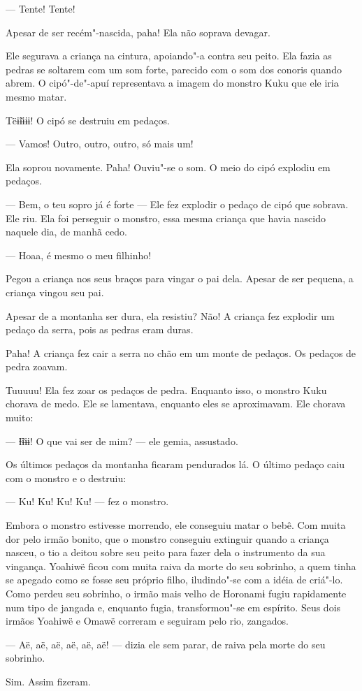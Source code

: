 --- Tente! Tente! 

Apesar de ser recém"-nascida, paha! Ela não soprava devagar. 
   
Ele segurava a criança na cintura, apoiando"-a contra seu peito. Ela fazia as pedras se soltarem com um som forte, parecido com o som dos
conoris quando abrem. O cipó"-de"-apuí representava a imagem do monstro
Kuku que ele iria mesmo matar. 

Tëɨ̃ɨɨɨɨ! O cipó se destruiu em pedaços. 

--- Vamos! Outro, outro, outro, só mais um!

Ela soprou novamente. Paha! Ouviu"-se o som. O meio do cipó explodiu em pedaços. 

--- Bem, o teu sopro já é forte --- Ele fez explodir o pedaço de cipó
que sobrava. Ele riu. Ela foi perseguir o monstro, essa mesma criança
que havia nascido naquele dia, de manhã cedo. 

--- Hoaa, é mesmo o meu filhinho! 

Pegou a criança nos seus braços para vingar o pai dela. Apesar de ser
pequena, a criança vingou seu pai. 

Apesar de a montanha ser dura, ela resistiu? Não! A criança fez explodir um
pedaço da serra, pois as pedras eram duras. 

Paha! A criança fez cair a serra no chão em um monte de pedaços. Os
pedaços de pedra zoavam.

Tuuuuu! Ela fez zoar os pedaços de pedra. Enquanto isso, o monstro Kuku
chorava de medo. Ele se lamentava, enquanto eles se aproximavam. Ele
chorava muito:

--- Ɨ̃ɨɨɨ! O que vai ser de mim? --- ele gemia, assustado. 

Os últimos pedaços da montanha ficaram pendurados lá. O último pedaço
caiu com o monstro e o destruiu: 

--- Ku! Ku! Ku! Ku! --- fez o monstro. 

Embora o monstro estivesse morrendo, ele conseguiu matar o bebê. Com
muita dor pelo irmão bonito, que o monstro conseguiu extinguir quando a
criança nasceu, o tio a deitou sobre seu peito para fazer dela o
instrumento da sua vingança. Yoahiwë ficou com muita raiva da morte do
seu sobrinho, a quem tinha se apegado como se fosse seu próprio filho,
iludindo"-se com a idéia de criá"-lo. Como perdeu seu sobrinho, o irmão
mais velho de Horonamɨ fugiu rapidamente num tipo de jangada e, enquanto
fugia, transformou"-se em espírito. Seus dois irmãos Yoahiwë e Omawë correram e seguiram pelo rio, zangados. 

--- Aë, aë, aë, aë, aë, aë! --- dizia ele sem parar, de raiva pela morte
do seu sobrinho. 

Sim. Assim fizeram.

 
